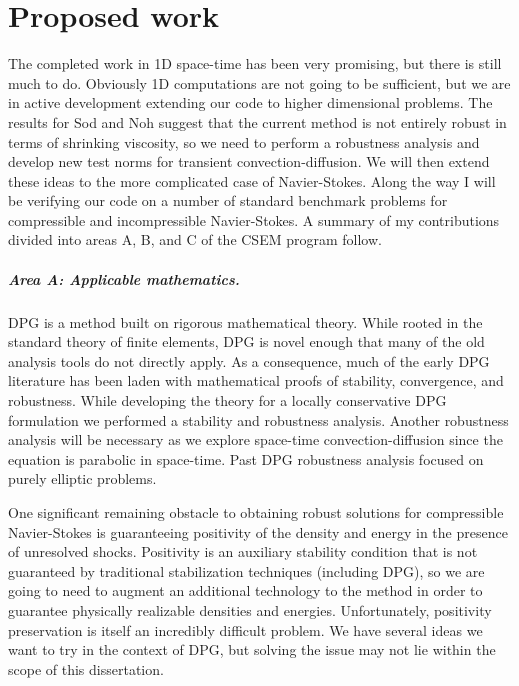 \documentclass[Proposal.tex]{subfiles}
\begin{document}
\chapter{Proposed work}
\label{sec:proposed}
The completed work in 1D space-time has been very promising, but there is still much to do. 
Obviously 1D computations are not going to be sufficient, but we are in active development extending our code
to higher dimensional problems.
The results for Sod and Noh suggest that the current method is not entirely robust in terms of shrinking viscosity,
so we need to perform a robustness analysis and develop new test norms for transient convection-diffusion.
We will then extend these ideas to the more complicated case of Navier-Stokes.
Along the way I will be verifying our code on a number of standard benchmark problems for compressible and incompressible Navier-Stokes.
A summary of my contributions divided into areas A, B, and C of the CSEM program follow.

\paragraph{Area A: Applicable mathematics.}
DPG is a method built on rigorous mathematical theory.
While rooted in the standard theory of finite elements, DPG is novel enough that many of the old analysis tools do not directly apply.
As a consequence, much of the early DPG literature has been laden with mathematical proofs of stability, convergence, and robustness.
While developing the theory for a locally conservative DPG formulation we performed a stability and robustness analysis.
Another robustness analysis will be necessary as we explore space-time convection-diffusion since the equation is parabolic in space-time.
Past DPG robustness analysis focused on purely elliptic problems.

One significant remaining obstacle to obtaining robust solutions for compressible Navier-Stokes is guaranteeing positivity of the density and
energy in the presence of unresolved shocks. 
Positivity is an auxiliary stability condition that is not guaranteed by traditional stabilization 
techniques (including DPG), so we are going to need to augment an additional technology to the method in order to guarantee physically
realizable densities and energies. 
Unfortunately, positivity preservation is itself an incredibly difficult problem. 
We have several ideas we want to try in the context of DPG, but solving the issue may not lie within the scope of this dissertation.
\end{document}
